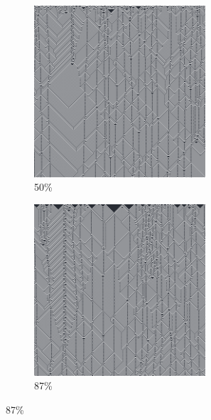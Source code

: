 \documentclass[12pt, fleqn]{report}                             %
\theoremstyle{break}                                            %
\begin{document}
\begin{figure}[h!]
\begin{subfigure}[b]{0.4\linewidth}
            \includegraphics[width=0.7\textwidth]{Images/54/c.png}
            \caption{50\%}
          \end{subfigure}
          \begin{subfigure}[b]{0.4\linewidth}
            \includegraphics[width=0.7\textwidth]{Images/54/d.png}
            \caption{87\%}
          \end{subfigure}
        \end{figure}
\end{document}
